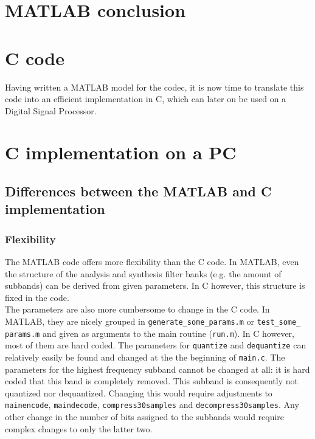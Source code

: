 \documentclass[a4paper]{article}
\begin{document}
\section{MATLAB conclusion}

\section{C code}
Having written a MATLAB model for the codec, it is now time to translate this code into an efficient implementation in C, which can later on be used on a Digital Signal Processor.

\section{C implementation on a PC}
\subsection{Differences between the MATLAB and C implementation}\label{sec:differences}

\subsubsection{Flexibility}
The MATLAB code offers more flexibility than the C code. In MATLAB, even the structure of the analysis and synthesis filter banks (e.g. the amount of subbands) can be derived from given parameters. In C however, this structure is fixed in the code.\\

The parameters are also more cumbersome to change in the C code. In MATLAB, they are nicely grouped in \texttt{generate\_some\_params.m} or \texttt{test\_some\_ params.m} and given as arguments to the main routine (\texttt{run.m}). In C however, most of them are hard coded. The parameters for \texttt{quantize} and \texttt{dequantize} can relatively easily be found and changed at the the beginning of \texttt{main.c}. The parameters for the highest frequency subband cannot be changed at all: it is hard coded that this band is completely removed. This subband is consequently not quantized nor dequantized. Changing this would require adjustments to \texttt{mainencode}, \texttt{maindecode}, \texttt{compress30samples} and \texttt{decompress30samples}. Any other change in the number of bits assigned to the subbands would require complex changes to only the latter two.\\
\end{document}
